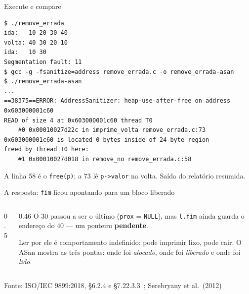 \documentclass[aspectratio=169]{beamer}
\newcommand{\dno}[4][UFSBlue]{%
  \node[cel, draw=#1, anchor=west] (#2a) at #3 {};
  \node[celv, draw=#1, fill=#1!8, right=0pt of #2a] (#2v) {#4};
  \node[cel, draw=#1, right=0pt of #2v] (#2p) {};
}
\newcommand{\vai}[3][seta]{\draw[#1] ($(#2p.center)+(0,0.1)$) -- ($(#3a.west)+(0,0.1)$);}
\newcommand{\volta}[3][seta]{\draw[#1] ($(#3a.center)+(0,-0.1)$) -- ($(#2p.east)+(0,-0.1)$);}
\newcommand{\liga}[2]{\vai{#1}{#2}\volta{#1}{#2}}
\newcommand{\cnull}[1]{\draw[UFSGray] (#1.south west) -- (#1.north east);}
\newcommand{\fonte}[1]{\vfill\hfill{\scriptsize\textcolor{UFSGray}{Fonte: #1}}}
\begin{document}
\begin{frame}[fragile]{Execute e compare}
\begin{lstlisting}[style=shellStyle]
$ ./remove_errada
ida:   10 20 30 40
volta: 40 30 20 10
ida:   10 30
Segmentation fault: 11
$ gcc -g -fsanitize=address remove_errada.c -o remove_errada-asan
$ ./remove_errada-asan
...
==38375==ERROR: AddressSanitizer: heap-use-after-free on address 0x603000001c60
READ of size 4 at 0x603000001c60 thread T0
    #0 0x00010027d22c in imprime_volta remove_errada.c:73
0x603000001c60 is located 0 bytes inside of 24-byte region
freed by thread T0 here:
    #1 0x00010027d018 in remove_no remove_errada.c:58
\end{lstlisting}
  \begin{center}
    \scriptsize\textcolor{UFSGray}{A linha 58 é o \texttt{free(p)};
    a 73 lê \texttt{p->valor} na volta. Saída do relatório resumida.}
  \end{center}
\end{frame}

\begin{frame}{A resposta: \texttt{fim} ficou apontando para um bloco liberado}
  \begin{columns}[c]
    \begin{column}{0.5\textwidth}
      \begin{center}
      \end{center}
    \end{column}
    \begin{column}{0.46\textwidth}
      \small
      O 30 passou a ser o último (\texttt{prox} = \texttt{NULL}), mas
      \texttt{l.fim} ainda guarda o endereço do 40 --- um ponteiro
      \textbf{pendente}.

      \medskip
      Ler por ele é comportamento indefinido: pode imprimir lixo, pode
      cair. O ASan mostra as três pontas: onde foi \emph{alocado}, onde foi
      \emph{liberado} e onde foi \emph{lido}.
    \end{column}
  \end{columns}
  \fonte{ISO/IEC 9899:2018, §6.2.4 e §7.22.3.3~\cite{iso2018c17};
    Serebryany et al.\ (2012)~\cite{serebryany2012asan}}
\end{frame}
\end{document}
